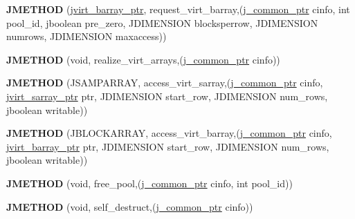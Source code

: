 \begin{DoxyCompactItemize}
\item 
{\bfseries J\+M\+E\+T\+H\+OD} (\hyperlink{structjvirt__barray__control}{jvirt\+\_\+barray\+\_\+ptr}, request\+\_\+virt\+\_\+barray,(\hyperlink{structjpeg__common__struct}{j\+\_\+common\+\_\+ptr} cinfo, int pool\+\_\+id, jboolean pre\+\_\+zero, J\+D\+I\+M\+E\+N\+S\+I\+ON blocksperrow, J\+D\+I\+M\+E\+N\+S\+I\+ON numrows, J\+D\+I\+M\+E\+N\+S\+I\+ON maxaccess))\hypertarget{structjpeg__memory__mgr_acc4c4f654f8430760d5450df24d608bc}{}\label{structjpeg__memory__mgr_acc4c4f654f8430760d5450df24d608bc}

\item 
{\bfseries J\+M\+E\+T\+H\+OD} (void, realize\+\_\+virt\+\_\+arrays,(\hyperlink{structjpeg__common__struct}{j\+\_\+common\+\_\+ptr} cinfo))\hypertarget{structjpeg__memory__mgr_a35cc0c3b3ecbc7209cdc23b2255932d8}{}\label{structjpeg__memory__mgr_a35cc0c3b3ecbc7209cdc23b2255932d8}

\item 
{\bfseries J\+M\+E\+T\+H\+OD} (J\+S\+A\+M\+P\+A\+R\+R\+AY, access\+\_\+virt\+\_\+sarray,(\hyperlink{structjpeg__common__struct}{j\+\_\+common\+\_\+ptr} cinfo,   \hyperlink{structjvirt__sarray__control}{jvirt\+\_\+sarray\+\_\+ptr} ptr,   J\+D\+I\+M\+E\+N\+S\+I\+ON start\+\_\+row,   J\+D\+I\+M\+E\+N\+S\+I\+ON num\+\_\+rows,   jboolean writable))\hypertarget{structjpeg__memory__mgr_a8e905d0cd80cb2230d136f279fa1560a}{}\label{structjpeg__memory__mgr_a8e905d0cd80cb2230d136f279fa1560a}

\item 
{\bfseries J\+M\+E\+T\+H\+OD} (J\+B\+L\+O\+C\+K\+A\+R\+R\+AY, access\+\_\+virt\+\_\+barray,(\hyperlink{structjpeg__common__struct}{j\+\_\+common\+\_\+ptr} cinfo,       \hyperlink{structjvirt__barray__control}{jvirt\+\_\+barray\+\_\+ptr} ptr,       J\+D\+I\+M\+E\+N\+S\+I\+ON start\+\_\+row,       J\+D\+I\+M\+E\+N\+S\+I\+ON num\+\_\+rows,       jboolean writable))\hypertarget{structjpeg__memory__mgr_a40a754797288886e5ab9fcf7e1b14345}{}\label{structjpeg__memory__mgr_a40a754797288886e5ab9fcf7e1b14345}

\item 
{\bfseries J\+M\+E\+T\+H\+OD} (void, free\+\_\+pool,(\hyperlink{structjpeg__common__struct}{j\+\_\+common\+\_\+ptr} cinfo, int pool\+\_\+id))\hypertarget{structjpeg__memory__mgr_a7e7e063767441999982d22c5cc0e9423}{}\label{structjpeg__memory__mgr_a7e7e063767441999982d22c5cc0e9423}

\item 
{\bfseries J\+M\+E\+T\+H\+OD} (void, self\+\_\+destruct,(\hyperlink{structjpeg__common__struct}{j\+\_\+common\+\_\+ptr} cinfo))\hypertarget{structjpeg__memory__mgr_ae80ddea0ba4f845f91d3a30e350b5f44}{}\label{structjpeg__memory__mgr_ae80ddea0ba4f845f91d3a30e350b5f44}

\end{DoxyCompactItemize}
